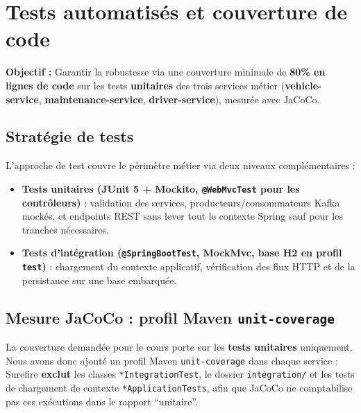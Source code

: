 \documentclass[12pt,a4paper]{article}
\begin{document}
\newpage

\section{Tests automatisés et couverture de code}

\begin{infobox}
\textbf{Objectif :} Garantir la robustesse via une couverture minimale de \textbf{80\% en lignes de code} sur les tests \textbf{unitaires} des trois services métier (\textbf{vehicle-service}, \textbf{maintenance-service}, \textbf{driver-service}), mesurée avec JaCoCo.
\end{infobox}

\subsection{Stratégie de tests}

L'approche de test couvre le périmètre métier via deux niveaux complémentaires :

\begin{itemize}
    \item \textbf{Tests unitaires (JUnit 5 + Mockito, \texttt{@WebMvcTest} pour les contrôleurs)} : validation des services, producteurs/consommateurs Kafka mockés, et endpoints REST sans lever tout le contexte Spring sauf pour les tranches nécessaires.
    \item \textbf{Tests d'intégration (\texttt{@SpringBootTest}, MockMvc, base H2 en profil \texttt{test})} : chargement du contexte applicatif, vérification des flux HTTP et de la persistance sur une base embarquée.
\end{itemize}

\subsection{Mesure JaCoCo : profil Maven \texttt{unit-coverage}}

La couverture demandée pour le cours porte sur les \textbf{tests unitaires} uniquement. Nous avons donc ajouté un profil Maven \texttt{unit-coverage} dans chaque service : Surefire \textbf{exclut} les classes \texttt{*IntegrationTest}, le dossier \texttt{intégration/} et les tests de chargement de contexte \texttt{*ApplicationTests}, afin que JaCoCo ne comptabilise pas ces exécutions dans le rapport ``unitaire''.
\end{document}
